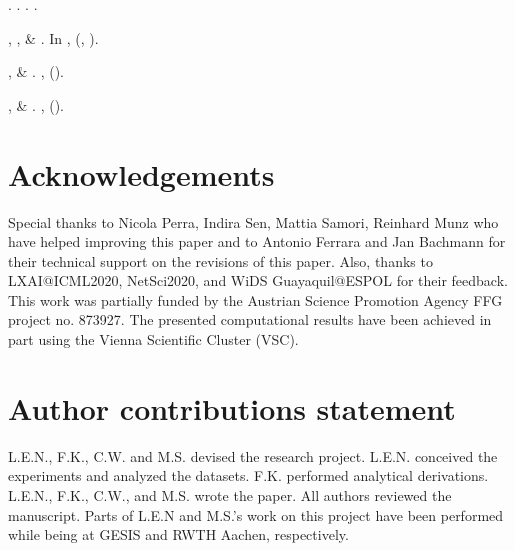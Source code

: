 \documentclass[fleqn,10pt]{wlscirep}
\begin{document}
\begin{thebibliography}{10}
.
\newblock {}.
\newblock
  .
\newblock {}.

, ,
   \& 
\newblock {}.
\newblock In \emph{}, 
  (, ).

,  \&
\newblock {}.
  \textbf{},  ().

,  \&
\newblock {}.
  \textbf{}, 
  ().

\end{thebibliography}


\section*{Acknowledgements}
Special thanks to Nicola Perra, Indira Sen, Mattia Samori, Reinhard Munz who have helped improving this paper and to Antonio Ferrara and Jan Bachmann for their technical support on the revisions of this paper. 
Also, thanks to LXAI@ICML2020, NetSci2020, and WiDS Guayaquil@ESPOL for their feedback.
This work was partially funded by the Austrian Science Promotion Agency FFG project no. 873927. The presented computational results have been achieved in part using the Vienna Scientific Cluster (VSC).


\section*{Author contributions statement}
L.E.N., F.K., C.W. and M.S. devised the research project. L.E.N. conceived the experiments and analyzed the datasets. F.K. performed analytical derivations. L.E.N., F.K., C.W., and M.S. wrote the paper. All authors reviewed the manuscript. Parts of L.E.N and M.S.'s work on this project have been performed while being at GESIS and RWTH Aachen, respectively.
\end{document}
